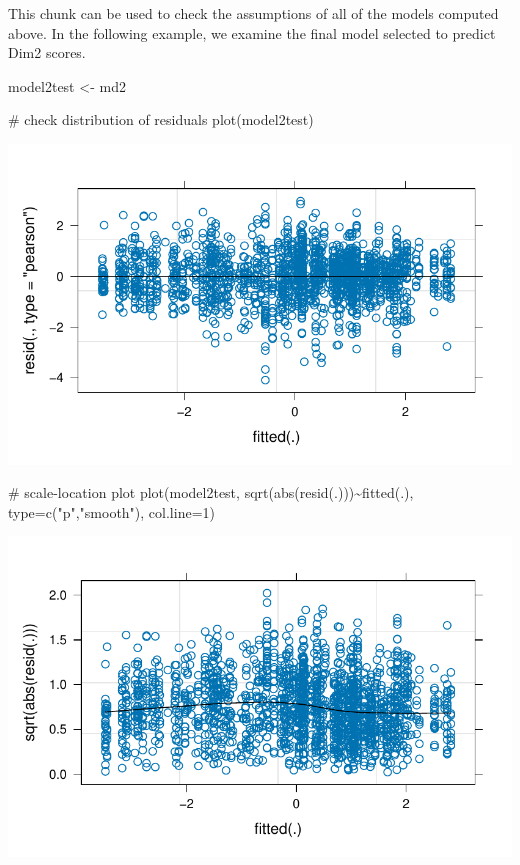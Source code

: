 \documentclass[
  letterpaper,
  DIV=11,
  numbers=noendperiod]{scrreprt}
\newenvironment{Shaded}{\begin{snugshade}}{\end{snugshade}}
\newcommand{\AttributeTok}[1]{\textcolor[rgb]{0.40,0.45,0.13}{#1}}
\newcommand{\CommentTok}[1]{\textcolor[rgb]{0.37,0.37,0.37}{#1}}
\newcommand{\DecValTok}[1]{\textcolor[rgb]{0.68,0.00,0.00}{#1}}
\newcommand{\FunctionTok}[1]{\textcolor[rgb]{0.28,0.35,0.67}{#1}}
\newcommand{\NormalTok}[1]{\textcolor[rgb]{0.00,0.23,0.31}{#1}}
\newcommand{\OtherTok}[1]{\textcolor[rgb]{0.00,0.23,0.31}{#1}}
\newcommand{\SpecialCharTok}[1]{\textcolor[rgb]{0.37,0.37,0.37}{#1}}
\newcommand{\StringTok}[1]{\textcolor[rgb]{0.13,0.47,0.30}{#1}}
\begin{document}
This chunk can be used to check the assumptions of all of the models
computed above. In the following example, we examine the final model
selected to predict Dim2 scores.

\begin{Shaded}
\begin{Highlighting}[]
\NormalTok{model2test }\OtherTok{\textless{}{-}}\NormalTok{ md2}

\CommentTok{\# check distribution of residuals}
\FunctionTok{plot}\NormalTok{(model2test)}
\end{Highlighting}
\end{Shaded}

\includegraphics{E_Ch6_Analysis_files/figure-pdf/lmer-diagnostics-1.pdf}

\begin{Shaded}
\begin{Highlighting}[]
\CommentTok{\# scale{-}location plot}
\FunctionTok{plot}\NormalTok{(model2test,}
     \FunctionTok{sqrt}\NormalTok{(}\FunctionTok{abs}\NormalTok{(}\FunctionTok{resid}\NormalTok{(.)))}\SpecialCharTok{\textasciitilde{}}\FunctionTok{fitted}\NormalTok{(.),}
     \AttributeTok{type=}\FunctionTok{c}\NormalTok{(}\StringTok{"p"}\NormalTok{,}\StringTok{"smooth"}\NormalTok{), }\AttributeTok{col.line=}\DecValTok{1}\NormalTok{)}
\end{Highlighting}
\end{Shaded}

\includegraphics{E_Ch6_Analysis_files/figure-pdf/lmer-diagnostics-2.pdf}
\end{document}
